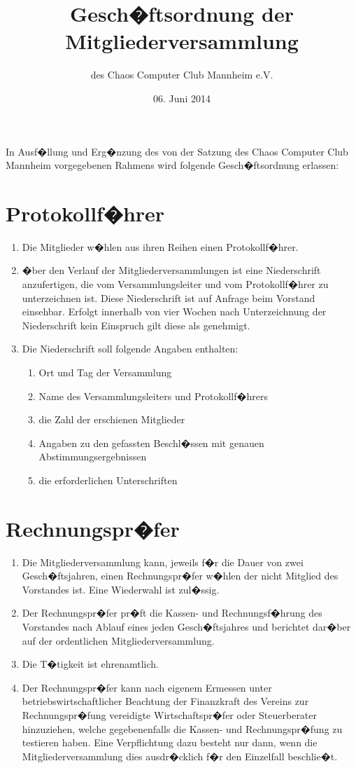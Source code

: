 \documentclass[a4paper, 12pt]{scrartcl}
\title{Gesch�ftsordnung der Mitgliederversammlung}
\subtitle{des Chaos Computer Club Mannheim e.V.}
\author{}
\date{06. Juni 2014}
\begin{document}
\maketitle

In Ausf�llung und Erg�nzung des von der Satzung des Chaos Computer Club
Mannheim vorgegebenen Rahmens wird folgende Gesch�ftsordnung erlassen:

\section{Protokollf�hrer}
\begin{enumerate}
	\item Die Mitglieder w�hlen aus ihren Reihen einen Protokollf�hrer.
	\item �ber den Verlauf der Mitgliederversammlungen ist eine Niederschrift anzufertigen, die vom Versammlungsleiter und vom Protokollf�hrer zu unterzeichnen ist. Diese Niederschrift ist auf Anfrage beim Vorstand einsehbar. Erfolgt innerhalb von vier Wochen nach Unterzeichnung der Niederschrift kein Einspruch gilt diese als genehmigt.
	\item Die Niederschrift soll folgende Angaben enthalten:
		\begin{enumerate}
	  	\item Ort und Tag der Versammlung
	    \item Name des Versammlungsleiters und Protokollf�hrers
	    \item die Zahl der erschienen Mitglieder
	    \item Angaben zu den gefassten Beschl�ssen mit genauen Abstimmungsergebnissen
	    \item die erforderlichen Unterschriften
		\end{enumerate}
\end{enumerate}

\section{Rechnungspr�fer}
\begin{enumerate}
	\item Die Mitgliederversammlung kann, jeweils f�r die Dauer von zwei
Gesch�ftsjahren, einen Rechnungspr�fer w�hlen der nicht Mitglied des
Vorstandes ist. Eine Wiederwahl ist zul�ssig.
	\item Der Rechnungspr�fer pr�ft die Kassen- und Rechnungsf�hrung des
Vorstandes nach Ablauf eines jeden Gesch�ftsjahres und berichtet dar�ber
auf der ordentlichen Mitgliederversammlung.
	\item Die T�tigkeit ist ehrenamtlich.
	\item Der Rechnungspr�fer kann nach eigenem Ermessen unter
betriebswirtschaftlicher Beachtung der Finanzkraft des Vereins zur
Rechnungspr�fung vereidigte Wirtschaftspr�fer oder Steuerberater
hinzuziehen, welche gegebenenfalls die Kassen- und Rechnungspr�fung zu
testieren haben. Eine Verpflichtung dazu besteht nur dann, wenn die
Mitgliederversammlung dies ausdr�cklich f�r den Einzelfall beschlie�t.
\end{enumerate}
\end{document}
